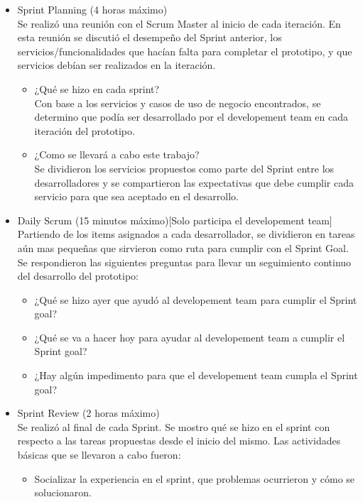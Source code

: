\begin{itemize}
  \item Sprint Planning (4 horas máximo)\\
  Se realizó una reunión con el Scrum Master al inicio de cada iteración. En esta reunión se discutió el desempeño del Sprint anterior, los servicios/funcionalidades que hacían falta para completar el prototipo, y que servicios debían ser realizados en la iteración.
	\begin{itemize}
	  \item ¿Qué se hizo en cada sprint? \\
	    Con base a los servicios y casos de uso de negocio encontrados, se determino que podía ser desarrollado por el developement team en cada iteración del prototipo.
	  \item ¿Como se llevará a cabo este trabajo? \\
	    Se dividieron los servicios propuestos como parte del Sprint entre los desarrolladores y se compartieron las expectativas que debe cumplir cada servicio para que sea aceptado en el desarrollo.
	\end{itemize}
  \item Daily Scrum (15 minutos máximo)[Solo participa el developement team] \\
  Partiendo de los items asignados a cada desarrollador, se dividieron en tareas aún mas pequeñas que sirvieron como ruta para cumplir con el Sprint Goal. Se respondieron las siguientes preguntas para llevar un seguimiento continuo del desarrollo del prototipo:
	\begin{itemize}
	  \item ¿Qué se hizo ayer que ayudó al developement team para cumplir el Sprint goal?
	  \item ¿Qué se va a hacer hoy para ayudar al developement team a cumplir el Sprint goal?
	  \item ¿Hay algún impedimento para que el developement team cumpla el Sprint goal?
	\end{itemize}
  \item Sprint Review (2 horas máximo) \\
  Se realizó al final de cada Sprint. Se mostro qué se hizo en el sprint con respecto a las tareas propuestas desde el inicio del mismo. Las actividades básicas que se llevaron a cabo fueron:
	\begin{itemize}
	  \item Socializar la experiencia en el sprint, que problemas ocurrieron y cómo se solucionaron.

\end{itemize}
\end{itemize}
